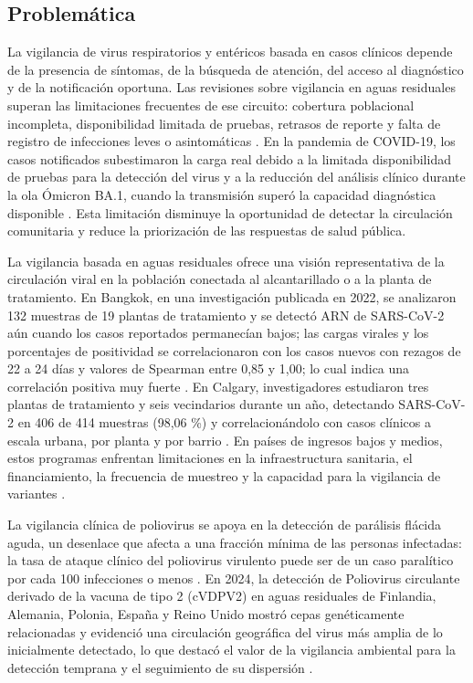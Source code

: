 \subsection{Problemática}

La vigilancia de virus respiratorios y entéricos basada en casos clínicos depende de la presencia de síntomas, de la búsqueda de atención, del acceso al diagnóstico y de la notificación oportuna. Las revisiones sobre vigilancia en aguas residuales superan las limitaciones frecuentes de ese circuito: cobertura poblacional incompleta, disponibilidad limitada de pruebas, retrasos de reporte y falta de registro de infecciones leves o asintomáticas \cite{Bubba_2023,Parkins_2023}. En la pandemia de COVID-19, los casos notificados subestimaron la carga real debido a la limitada disponibilidad de pruebas para la detección del virus y a la reducción del análisis clínico durante la ola Ómicron BA.1, cuando la transmisión superó la capacidad diagnóstica disponible \cite{Parkins_2023}. Esta limitación disminuye la oportunidad de detectar la circulación comunitaria y reduce la priorización de las respuestas de salud pública.

La vigilancia basada en aguas residuales ofrece una visión representativa de la circulación viral en la población conectada al alcantarillado o a la planta de tratamiento. En Bangkok, en una investigación publicada en 2022, se analizaron 132 muestras de 19 plantas de tratamiento y se detectó ARN de SARS-CoV-2 aún cuando los casos reportados permanecían bajos; las cargas virales y los porcentajes de positividad se correlacionaron con los casos nuevos con rezagos de 22 a 24 días y valores de Spearman entre 0,85 y 1,00; lo cual indica una correlación positiva muy fuerte \cite{Sangsanont_2022}. En Calgary, investigadores estudiaron tres plantas de tratamiento y seis vecindarios durante un año, detectando SARS-CoV-2 en 406 de 414 muestras (98,06 \%) y correlacionándolo con casos clínicos a escala urbana, por planta y por barrio \cite{Acosta_2022}. En países de ingresos bajos y medios, estos programas enfrentan limitaciones en la infraestructura sanitaria, el financiamiento, la frecuencia de muestreo y la capacidad para la vigilancia de variantes \cite{Parkins_2023}.

La vigilancia clínica de poliovirus se apoya en la detección de parálisis flácida aguda, un desenlace que afecta a una fracción mínima de las personas infectadas: la tasa de ataque clínico del poliovirus virulento puede ser de un caso paralítico por cada 100 infecciones o menos \cite{Zurbriggen_2008}. En 2024, la detección de Poliovirus circulante derivado de la vacuna de tipo 2 (cVDPV2) en aguas residuales de Finlandia, Alemania, Polonia, España y Reino Unido mostró cepas genéticamente relacionadas y evidenció una circulación geográfica del virus más amplia de lo inicialmente detectado, lo que destacó el valor de la vigilancia ambiental para la detección temprana y el seguimiento de su dispersión \cite{Bottcher_2025}.

